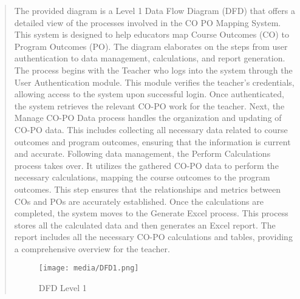 \documentclass[12pt]{report}
\begin{document}
\begin{quote}
		\hspace{1cm}The provided diagram is a Level 1 Data Flow Diagram (DFD) that offers a detailed view of the processes involved in the CO PO Mapping System. This system is designed to help educators map Course Outcomes (CO) to Program Outcomes (PO). The diagram elaborates on the steps from user authentication to data management, calculations, and report generation.
		The process begins with the Teacher who logs into the system through the User Authentication module. This module verifies the teacher’s credentials, allowing access to the system upon successful login. Once authenticated, the system retrieves the relevant CO-PO work for the teacher.
		Next, the Manage CO-PO Data process handles the organization and updating of CO-PO data. This includes collecting all necessary data related to course outcomes and program outcomes, ensuring that the information is current and accurate.
		Following data management, the Perform Calculations process takes over. It utilizes the gathered CO-PO data to perform the necessary calculations, mapping the course outcomes to the program outcomes. This step ensures that the relationships and metrics between COs and POs are accurately established.
		Once the calculations are completed, the system moves to the Generate Excel process. This process stores all the calculated data and then generates an Excel report. The report includes all the necessary CO-PO calculations and tables, providing a comprehensive overview for the teacher.
		
		\begin{figure}
			\centering
			\texttt{[image: media/DFD1.png]}\\
			\caption{DFD Level 1}
		\end{figure}
		\clearpage
		

\end{quote}
\end{document}
